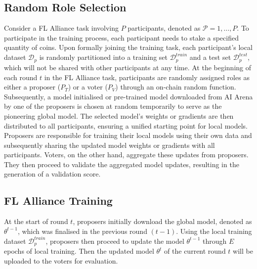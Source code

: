 \documentclass[conference]{IEEEtran}
\newcommand{\rui}[1]{{\color{black} #1}}
\newcommand{\FL}{\ac{FL} Alliance\xspace}
\begin{document}
\subsection{Random Role Selection} 
Consider a \FL task involving $P$ participants, denoted as $\mathcal{P} = {1, \ldots, P}$. To participate in the training process, each participant needs to stake a specified quantity of coins. \rui{Upon formally joining the training task, each participant's local dataset $\mathcal{D}_p$ is randomly partitioned into a training set $\mathcal{D}_p^{train}$ and a test set $\mathcal{D}_p^{test}$, which will not be shared with other participants at any time. At the beginning of each round $t$ in the \FL task, participants are randomly assigned roles as either a proposer ($P_T$) or a voter ($P_V$) through an on-chain random function. Subsequently, a model initialised or pre-trained model downloaded from AI Arena by one of the proposers is chosen at random temporarily to serve as the pioneering global model. The selected model's weights or gradients are then distributed to all participants, ensuring a unified starting point for local models. Proposers are responsible for training their local models using their own data and subsequently sharing the updated model weights or gradients with all participants. Voters, on the other hand, aggregate these updates from proposers. They then proceed to validate the aggregated model updates, resulting in the generation of a validation score.
}





\subsection{\FL Training} At the start of round $t$, proposers initially download the global model, denoted as $\theta^{t-1}$, which was finalised in the previous round $(t-1)$. Using the local training dataset $\mathcal{D}_p^{train}$, proposers then proceed to update the model $\theta^{t-1}$ through $E$ epochs of local training. Then the updated model $\theta^{t}$ of the current round $t$ will be uploaded to the voters for evaluation.
\end{document}
